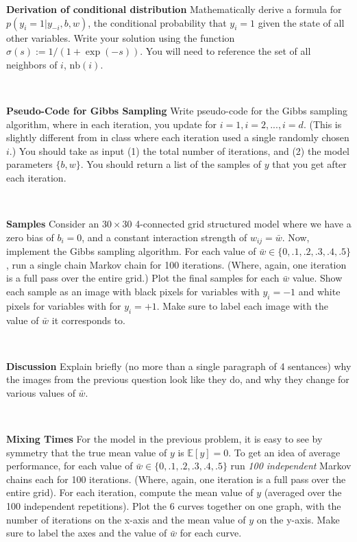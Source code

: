 \documentclass[11pt]{article}
\begin{document}
\begin{problem}{5} \textbf{Derivation of conditional distribution}
Mathematically derive a formula for $p(y_i = 1 \vert y_{-i}, b, w)$, the conditional probability that $y_i=1$ given the state of all other variables. Write your solution using the function $\sigma(s) := 1/(1+\exp(-s))$. You will need to reference the set of all neighbors of $i$, $\text{nb}(i)$. 
\end{problem}
\\

\begin{problem}{5} \textbf{Pseudo-Code for Gibbs Sampling}
Write pseudo-code for the Gibbs sampling algorithm, where in each iteration, you update for $i=1,i=2,...,i=d$. (This is slightly different from in class where each iteration used a single randomly chosen $i$.) You should take as input (1) the total number of iterations, and (2) the model parameters $\{b, w\}$. You should return a list of the samples of $y$ that you get after each iteration.
\end{problem}
\\

\begin{problem}{5} \textbf{Samples}
Consider an $30 \times 30$ 4-connected grid structured model where we have a zero bias of $b_i=0$, and a constant interaction strength of $w_{ij}=\bar{w}$.  Now, implement the Gibbs sampling algorithm. For each value of $\bar{w} \in \{0, .1, .2, .3, .4, .5\}$, run a single chain Markov chain for 100 iterations. (Where, again, one iteration is a full pass over the entire grid.) Plot the final samples for each $\bar{w}$ value. Show each sample as an image with black pixels for variables with $y_i=-1$ and white pixels for variables with for $y_i=+1$. Make sure to label each image with the value of $\bar{w}$ it corresponds to.
\end{problem}
\\

\begin{problem}{5} \textbf{Discussion}
Explain briefly (no more than a single paragraph of 4 sentances) why the images from the previous question look like they do, and why they change for various values of $\bar{w}$.
\end{problem}
\\


\begin{problem}{5} \textbf{ Mixing Times}
For the model in the previous problem, it is easy to see by symmetry that the true mean value of $y$ is $\mathbb{E}[y]=0$. To get an idea of average performance, for each value of $\bar{w} \in \{0, .1, .2, .3, .4, .5\}$ run \emph{100 independent} Markov chains each for 100 iterations. (Where, again, one iteration is a full pass over the entire grid). For each iteration, compute the mean value of $y$ (averaged over the 100 independent repetitions).
Plot the 6 curves together on one graph, with the number of iterations on the x-axis and the mean value of $y$ on the y-axis. Make sure to label the axes and the value of $\bar{w}$ for each curve.
\end{problem}
\\
\end{document}
